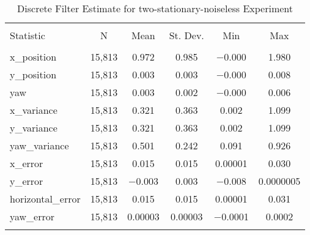 
\begin{table}[h] \centering 
  \caption{Discrete Filter Estimate for two-stationary-noiseless Experiment} 
  \label{tab:two_stationary_noiseless_discrete_summary} 
\begin{tabular}{@{\extracolsep{5pt}}lccccc} 
\\[-1.8ex]\hline 
\hline \\[-1.8ex] 
Statistic & \multicolumn{1}{c}{N} & \multicolumn{1}{c}{Mean} & \multicolumn{1}{c}{St. Dev.} & \multicolumn{1}{c}{Min} & \multicolumn{1}{c}{Max} \\ 
\hline \\[-1.8ex] 
x\_position & 15,813 & 0.972 & 0.985 & $-$0.000 & 1.980 \\ 
y\_position & 15,813 & 0.003 & 0.003 & $-$0.000 & 0.008 \\ 
yaw & 15,813 & 0.003 & 0.002 & $-$0.000 & 0.006 \\ 
x\_variance & 15,813 & 0.321 & 0.363 & 0.002 & 1.099 \\ 
y\_variance & 15,813 & 0.321 & 0.363 & 0.002 & 1.099 \\ 
yaw\_variance & 15,813 & 0.501 & 0.242 & 0.091 & 0.926 \\ 
x\_error & 15,813 & 0.015 & 0.015 & 0.00001 & 0.030 \\ 
y\_error & 15,813 & $-$0.003 & 0.003 & $-$0.008 & 0.0000005 \\ 
horizontal\_error & 15,813 & 0.015 & 0.015 & 0.00001 & 0.031 \\ 
yaw\_error & 15,813 & 0.00003 & 0.00003 & $-$0.0001 & 0.0002 \\ 
\hline \\[-1.8ex] 
\end{tabular} 
\end{table} 
